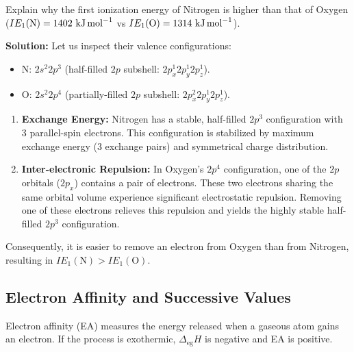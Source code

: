 \documentclass[12pt,a4paper]{article}
\begin{document}
\begin{tcolorbox}[examplebox, title={Anomaly 2: Nitrogen ($Z=7$) vs. Oxygen ($Z=8$)}]
  Explain why the first ionization energy of Nitrogen is higher than that of Oxygen ($IE_1(\text{N}) = 1402\ \text{kJ\,mol}^{-1}$ vs $IE_1(\text{O}) = 1314\ \text{kJ\,mol}^{-1}$).
  \par\vspace{4pt}
  \textbf{Solution:}
  Let us inspect their valence configurations:
  \begin{itemize}[leftmargin=1cm, itemsep=2pt]
    \item $\text{N}$: $2s^2 2p^3$ (half-filled $2p$ subshell: $2p_x^1 2p_y^1 2p_z^1$).
    \item $\text{O}$: $2s^2 2p^4$ (partially-filled $2p$ subshell: $2p_x^2 2p_y^1 2p_z^1$).
  \end{itemize}
  \begin{enumerate}
    \item \textbf{Exchange Energy:} Nitrogen has a stable, half-filled $2p^3$ configuration with 3 parallel-spin electrons. This configuration is stabilized by maximum exchange energy ($3$ exchange pairs) and symmetrical charge distribution.
    \item \textbf{Inter-electronic Repulsion:} In Oxygen's $2p^4$ configuration, one of the $2p$ orbitals ($2p_x$) contains a pair of electrons. These two electrons sharing the same orbital volume experience significant electrostatic repulsion. Removing one of these electrons relieves this repulsion and yields the highly stable half-filled $2p^3$ configuration.
  \end{enumerate}
  Consequently, it is easier to remove an electron from Oxygen than from Nitrogen, resulting in $IE_1(\text{N}) > IE_1(\text{O})$.
\end{tcolorbox}

\subsection{Electron Affinity and Successive Values}
Electron affinity (EA) measures the energy released when a gaseous atom gains an electron. If the process is exothermic, $\Delta_{\text{eg}}H$ is negative and EA is positive.
\end{document}

